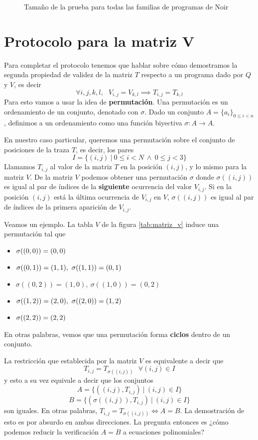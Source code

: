 \documentclass[11pt,a4paper]{tesis}
\begin{document}
\begin{figure}[htbp!]
	\caption{Tamaño de la prueba para todas las familias de programas de Noir}
	\label{fig:tamanios-prueba}
\end{figure}

\chapter{Protocolo para la matriz V}\label{sec:apendice_matriz_v}

Para completar el protocolo tenemos que hablar sobre cómo demostramos la segunda propiedad de validez de la matriz $T$ respecto a un programa dado por $Q$ y $V$, es decir
$$\forall i,j,k,l,~~~ V_{i,j} = V_{k,l} \implies T_{i,j} = T_{k,l}$$
Para esto vamos a usar la idea de \textbf{permutación}. Una permutación es un ordenamiento de un conjunto, denotado con $\sigma$. Dado un conjunto $A = \{a_i\}_{0\leq i < n}$, definimos a un ordenamiento como una función biyectiva $\sigma: A \rightarrow A$. 

En nuestro caso particular, queremos una permutación sobre el conjunto de posiciones de la traza $T$, es decir, los pares 
$$I = \{(i,j) ~|~ 0 \leq i < N ~ \land ~ 0 \leq j < 3\}$$
Llamamos $T_{i,j}$ al valor de la matriz $T$ en la posición $(i,j)$, y lo mismo para la matriz $V$. De la matriz $V$ podemos obtener una permutación $\sigma$ donde $\sigma((i,j))$ es igual al par de índices de la \textbf{siguiente} ocurrencia del valor $V_{i,j}$. Si en la posición $(i,j)$ está la última ocurrencia de $V_{i,j}$ en $V$, $\sigma((i,j))$ es igual al par de índices de la primera aparición de $V_{i,j}$.

Veamos un ejemplo. La tabla $V$ de la figura \ref{tab:matriz_v} induce una permutación tal que 
\begin{itemize}
	\item $\textcolor{black}{\sigma((0,0)) = (0,0)}$ 
	\item$\textcolor{black}{\sigma((0,1)) = (1,1), ~\sigma((1,1)) = (0,1)}$
	\item$\sigma((0,2)) = (1,0), ~\sigma((1,0)) = (0,2)$
	\item$\textcolor{black}{\sigma((1,2)) = (2,0), ~\sigma((2,0)) = (1,2)}$
	\item$\textcolor{black}{\sigma((2,2)) = (2,2)}$    
\end{itemize}
En otras palabras, vemos que una permutación forma \textbf{ciclos} dentro de un conjunto. 

La restricción que establecida por la matriz $V$ es equivalente a decir que 
$$T_{i,j} = T_{\sigma((i,j))} ~~~ \forall (i,j)\in I$$
y esto a su vez equivale a decir que los conjuntos 
$$A = \{((i,j), T_{i,j}) ~ | ~ (i,j)\in I\}$$
$$B = \{(\sigma((i,j)), T_{i,j}) ~ | ~ (i,j)\in I\}$$
son iguales. En otras palabras, $T_{i,j} = T_{\sigma((i,j))} \Leftrightarrow A = B$. La demostración de esto es por absurdo en ambas direcciones. La pregunta entonces es ¿cómo podemos reducir la verificación $A=B$ a ecuaciones polinomiales?
\end{document}
